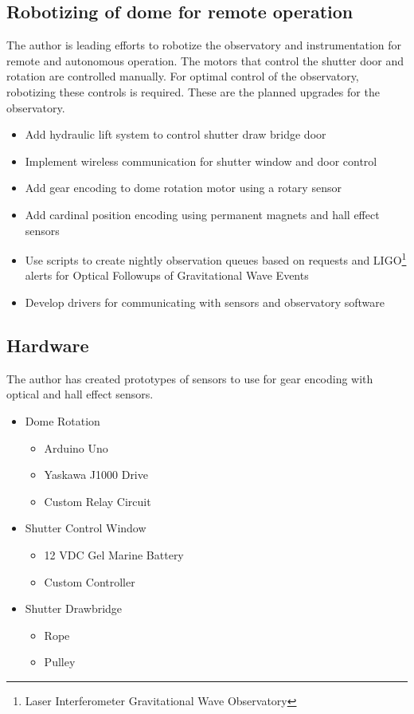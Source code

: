 \subsection{Robotizing of dome for remote operation}
The author is leading efforts to robotize the observatory and instrumentation for remote and autonomous operation.
The motors that control the shutter door and rotation are controlled manually.
For optimal control of the observatory, robotizing these controls is required.
These are the planned upgrades for the observatory.
\begin{itemize}
    \item Add hydraulic lift system to control shutter draw bridge door
    \item Implement wireless communication for shutter window and door control
    \item Add gear encoding to dome rotation motor using a rotary sensor
    \item Add cardinal position encoding using permanent magnets and hall effect sensors
    \item Use scripts to create nightly observation queues based on requests and LIGO\footnote{Laser Interferometer Gravitational Wave Observatory} alerts for Optical Followups of Gravitational Wave Events
    \item Develop drivers for communicating with sensors and observatory software
\end{itemize}

\subsection{Hardware}
The author has created prototypes of sensors to use for gear encoding with optical and hall effect sensors.

\begin{itemize}
    \item Dome Rotation
        \begin{itemize}
            \item Arduino Uno  
            \item Yaskawa J1000 Drive
            \item Custom Relay Circuit
        \end{itemize}
    \item Shutter Control Window
        \begin{itemize}
            \item 12 VDC Gel Marine Battery
            \item Custom Controller
        \end{itemize}
    \item Shutter Drawbridge
        \begin{itemize}
            \item Rope
            \item Pulley
        \end{itemize}
\end{itemize}
    
